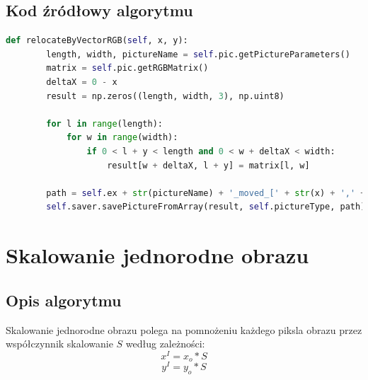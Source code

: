 \documentclass[a4paper,12pt, titlepage]{report}
\begin{document}
\subsection*{Kod źródłowy algorytmu}
\begin{lstlisting}[language=Python]
def relocateByVectorRGB(self, x, y):
        length, width, pictureName = self.pic.getPictureParameters()
        matrix = self.pic.getRGBMatrix()
        deltaX = 0 - x
        result = np.zeros((length, width, 3), np.uint8)

        for l in range(length):
            for w in range(width):
                if 0 < l + y < length and 0 < w + deltaX < width:
                    result[w + deltaX, l + y] = matrix[l, w]

        path = self.ex + str(pictureName) + '_moved_[' + str(x) + ',' + str(y) + '].png'
        self.saver.savePictureFromArray(result, self.pictureType, path)
\end{lstlisting}

\section{Skalowanie jednorodne obrazu}
\subsection*{Opis algorytmu}
\par Skalowanie jednorodne obrazu polega na pomnożeniu każdego piksla obrazu przez współczynnik skalowanie \(S\) według zależności:\[x^{I}=x_{o}*S\]\[y^{I}=y_{o}*S\]
\end{document}
